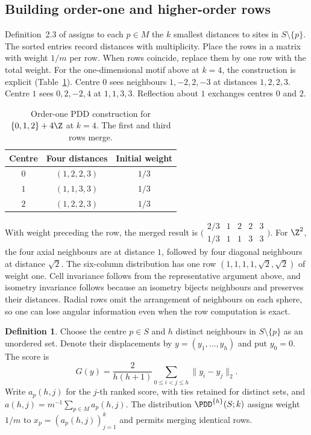 \documentclass[11pt,a4paper]{article}
\theoremstyle{definition}
\newtheorem{definition}{Definition}
\begin{document}
\subsection{Building order-one and higher-order rows}

Definition~2.3 of \cite{wkhigher} assigns to each \(p\in M\) the \(k\) smallest distances to sites in \(S\setminus\{p\}\). The sorted entries record distances with multiplicity. Place the rows in a matrix with weight \(1/m\) per row. When rows coincide, replace them by one row with the total weight. For the one-dimensional motif above at \(k=4\), the construction is explicit (Table~\ref{tab:pdd}). Centre \(0\) sees neighbours \(1,-2,2,-3\) at distances \(1,2,2,3\). Centre \(1\) sees \(0,2,-2,4\) at \(1,1,3,3\). Reflection about \(1\) exchanges centres \(0\) and \(2\).

\begin{table}[htbp]
\centering
\caption{Order-one PDD construction for \(\{0,1,2\}+4\Z\) at \(k=4\). The first and third rows merge.}\label{tab:pdd}
\begin{tabular}{ccc}
\toprule
Centre & Four distances & Initial weight\\
\midrule
\(0\) & \((1,2,2,3)\) & \(1/3\)\\
\(1\) & \((1,1,3,3)\) & \(1/3\)\\
\(2\) & \((1,2,2,3)\) & \(1/3\)\\
\bottomrule
\end{tabular}
\end{table}

With weight preceding the row, the merged result is \(\bigl(\begin{smallmatrix}2/3&1&2&2&3\\1/3&1&1&3&3\end{smallmatrix}\bigr)\). For \(\Z^2\), the four axial neighbours are at distance \(1\), followed by four diagonal neighbours at distance \(\sqrt 2\). The six-column distribution has one row \((1,1,1,1,\sqrt 2,\sqrt 2)\) of weight one. Cell invariance follows from the representative argument above, and isometry invariance follows because an isometry bijects neighbours and preserves their distances. Radial rows omit the arrangement of neighbours on each sphere, so one can lose angular information even when the row computation is exact.

\begin{definition}\label{def:score}
Choose the centre \(p\in S\) and \(h\) distinct neighbours in \(S\setminus\{p\}\) as an unordered set. Denote their displacements by \(y=(y_1,\ldots,y_h)\) and put \(y_0=0\). The score is
\begin{equation}\label{eq:score}
G(y)=\frac{2}{h(h+1)}\sum_{0\le i<j\le h}\|y_i-y_j\|_2 .
\end{equation}
Write \(a_p(h,j)\) for the \(j\)-th ranked score, with ties retained for distinct sets, and \(a(h,j)=m^{-1}\sum_{p\in M}a_p(h,j)\). The distribution \(\PDD^{\{h\}}(S;k)\) assigns weight \(1/m\) to \(x_p=(a_p(h,j))_{j=1}^k\) and permits merging identical rows.
\end{definition}
\end{document}
